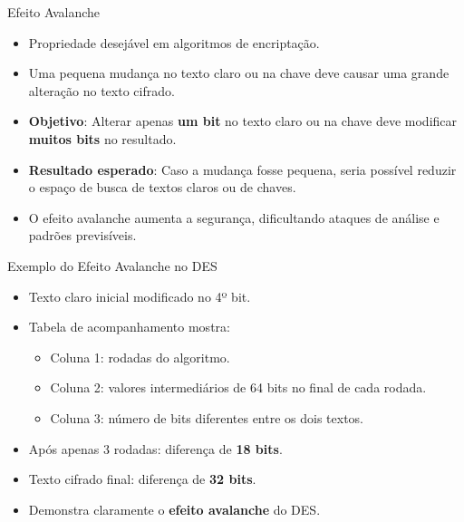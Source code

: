 \begin{frame}{Efeito Avalanche}
    \begin{itemize}
        \item Propriedade desejável em algoritmos de encriptação.
        \item Uma pequena mudança no texto claro ou na chave deve causar uma grande alteração no texto cifrado.
        \item \textbf{Objetivo}: Alterar apenas \textbf{um bit} no texto claro ou na chave deve modificar \textbf{muitos bits} no resultado.
        \item \textbf{Resultado esperado}: Caso a mudança fosse pequena, seria possível reduzir o espaço de busca de textos claros ou de chaves.
        \item O efeito avalanche aumenta a segurança, dificultando ataques de análise e padrões previsíveis.
    \end{itemize}
\end{frame}

\begin{frame}{Exemplo do Efeito Avalanche no DES}
    \begin{itemize}
        \item Texto claro inicial  modificado no 4º bit.
        \item Tabela de acompanhamento mostra:
              \begin{itemize}
                  \item Coluna 1: rodadas do algoritmo.
                  \item Coluna 2: valores intermediários de 64 bits no final de cada rodada.
                  \item Coluna 3: número de bits diferentes entre os dois textos.
              \end{itemize}
        \item Após apenas 3 rodadas: diferença de \textbf{18 bits}.
        \item Texto cifrado final: diferença de \textbf{32 bits}.
        \item Demonstra claramente o \textbf{efeito avalanche} do DES.
    \end{itemize}



\end{frame}


